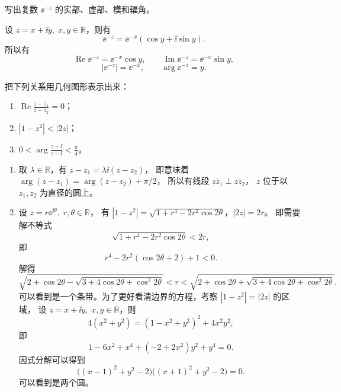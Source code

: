 \begin{question}
写出复数 \(\ee^{-z}\) 的实部、虚部、模和辐角。
\begin{solution}
设 \(z=x+\ii y,\;x,y\in\mathbb{R}\)，则有
\[
\ee^{-z}=\ee^{-x}(\cos y+\ii\sin y).
\]
所以有
\[
\operatorname{Re}\ee^{-z}=\ee^{-x}\cos y,\qquad
\operatorname{Im}\ee^{-z}=\ee^{-x}\sin y,
\]
\[
|\ee^{-z}|=\ee^{-x},\qquad
\arg\ee^{-z}=y.
\]
\end{solution}
\end{question}


\begin{question}
把下列关系用几何图形表示出来：

\begin{enumerate}
  \item \(\displaystyle\operatorname{Re}\frac{z-z_1}{z-z_2}=0\)；
  \item \(|1-z^2|<|2z|\)；
  \item \(\displaystyle 0<\arg\frac{z+\ii}{z-\ii}<\frac{\pi}{4}\)。
\end{enumerate}
\begin{solution}
\begin{enumerate}
  \item 取 \(\lambda\in\mathbb{R}\)，有 \(z-z_1=\lambda\ii(z-z_2)\)，
  即意味着 \(\arg(z-z_1)=\arg(z-z_2)+\pi/2\)，
  所以有线段 \(\overline{zz_1}\perp\overline{zz_2}\)，
  \(z\) 位于以 \(z_1,z_2\) 为直径的圆上。

  \begin{center}
  \end{center}

  \item 设 \(z=r\ee^{\ii\theta},\;r,\theta\in\mathbb{R}\)，
  有 \(|1-z^2|=\sqrt{1+r^4-2r^2\cos2\theta}\)，\(|2z|=2r\)。
  即需要解不等式
  \[
  \sqrt{1+r^4-2r^2\cos2\theta}<2r,
  \]
  即
  \[
  r^4-2r^2(\cos2\theta+2)+1<0.
  \]
  解得
  \[
  \sqrt{2+\cos2\theta-\sqrt{3+4\cos2\theta+\cos^2\!2\theta}}
  <r<
  \sqrt{2+\cos2\theta+\sqrt{3+4\cos2\theta+\cos^2\!2\theta}}.
  \]
  可以看到是一个条带。为了更好看清边界的方程，考察 \(|1-z^2|=|2z|\) 的区域，
  设 \(z=x+\ii y,\;x,y\in\mathbb{R}\)，则
  \[
  4(x^2+y^2)=(1-x^2+y^2)^2+4x^2y^2,
  \]
  即
  \[
  1-6x^2+x^4+(-2+2x^2)y^2+y^4=0.
  \]
  因式分解可以得到
  \[
  \bigl((x-1)^2+y^2-2\bigr)\bigl((x+1)^2+y^2-2\bigr)=0.
  \]
  可以看到是两个圆。


\end{enumerate}
\end{solution}
\end{question}
